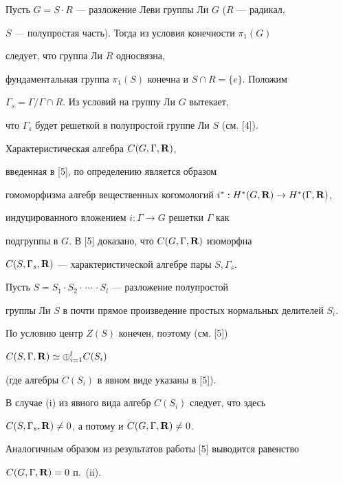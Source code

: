 \begin{pf}


Пусть $G=S \cdot R$ --- разложение Леви группы Ли $G$ ($R$ --- радикал,


$S$ --- полупростая часть). Тогда из условия конечности $\pi_1(G)$


следует, что группа Ли $R$ односвязна,


фундаментальная группа $\pi_1(S)$ конечна и $S \cap R= \{ e \}$. Положим


$\Gamma_s = \Gamma /\Gamma \cap R$. Из условий на группу Ли $G$ вытекает,


что $\Gamma _s$ будет решеткой в полупростой группе Ли $S$ (см. [4]).





Характеристическая алгебра $C(G, \Gamma, \bold R)$,


введенная в [5], по определению является образом


гомоморфизма алгебр вещественных когомологий $i^\ast : H^\ast


(G, \bold R) \to H^\ast (\Gamma, \bold R)$,


индуцированного вложением $i : \Gamma \to G$ решетки $\Gamma$ как


подгруппы в $G$. В [5] доказано, что $C(G, \Gamma, \bold R)$ изоморфна


$C(S, \Gamma_s, \bold R)$ --- характеристической алгебре пары $S, \Gamma_s$.


Пусть $S=S_1 \cdot S_2 \cdot\, \dotsb\, \cdot S_l$ --- разложение полупростой


группы Ли $S$ в почти прямое произведение простых нормальных делителей $S_i$.


По условию центр $Z(S)$ конечен, поэтому (см. [5])


$C(S,\Gamma, \bold R) \simeq \oplus _{i=1}^l C(S_i)$


(где алгебры $C(S_i)$ в явном виде указаны в [5]).


В случае (i) из явного вида алгебр $C(S_i)$ следует, что здесь


$C(S, \Gamma_s, \bold R) \ne {0}$, а потому и $C(G, \Gamma, \bold R) \ne


{0}$.





Аналогичным образом из результатов работы [5] выводится равенство


$C(G, \Gamma, \bold R) = {0}$ п.~(ii).


\end{pf}





